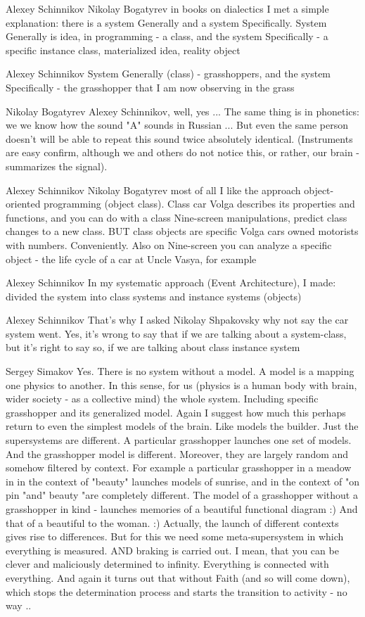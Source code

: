 \documentclass[11pt,a4paper]{article}
\begin{document}
Alexey Schinnikov Nikolay Bogatyrev in books on dialectics I met a simple
explanation: there is a system Generally and a system Specifically. System
Generally is idea, in programming - a class, and the system Specifically - a
specific instance class, materialized idea, reality object

Alexey Schinnikov System Generally (class) - grasshoppers, and the system
Specifically - the grasshopper that I am now observing in the grass

Nikolay Bogatyrev Alexey Schinnikov, well, yes ... The same thing is in
phonetics: we we know how the sound "A" sounds in Russian ... But even the
same person doesn’t will be able to repeat this sound twice absolutely
identical. (Instruments are easy confirm, although we and others do not notice
this, or rather, our brain - summarizes the signal).

Alexey Schinnikov Nikolay Bogatyrev most of all I like the approach
object-oriented programming (object class). Class car Volga describes its
properties and functions, and you can do with a class Nine-screen
manipulations, predict class changes to a new class. BUT class objects are
specific Volga cars owned motorists with numbers. Conveniently. Also on
Nine-screen you can analyze a specific object - the life cycle of a car at
Uncle Vasya, for example

Alexey Schinnikov In my systematic approach (Event Architecture), I made:
divided the system into class systems and instance systems (objects)

Alexey Schinnikov That's why I asked Nikolay Shpakovsky why not say the car
system went. Yes, it’s wrong to say that if we are talking about a
system-class, but it’s right to say so, if we are talking about class instance
system

Sergey Simakov Yes. There is no system without a model. A model is a mapping
one physics to another. In this sense, for us (physics is a human body with
brain, wider society - as a collective mind) the whole system. Including
specific grasshopper and its generalized model. Again I suggest how much this
perhaps return to even the simplest models of the brain. Like models the
builder. Just the supersystems are different. A particular grasshopper
launches one set of models. And the grasshopper model is different. Moreover,
they are largely random and somehow filtered by context. For example a
particular grasshopper in a meadow in in the context of "beauty" launches
models of sunrise, and in the context of "on pin "and" beauty "are completely
different. The model of a grasshopper without a grasshopper in kind - launches
memories of a beautiful functional diagram :) And that of a beautiful to the
woman. :) Actually, the launch of different contexts gives rise to
differences. But for this we need some meta-supersystem in which everything is
measured. AND braking is carried out. I mean, that you can be clever and
maliciously determined to infinity. Everything is connected with
everything. And again it turns out that without Faith (and so will come down),
which stops the determination process and starts the transition to activity -
no way ..
\end{document}
